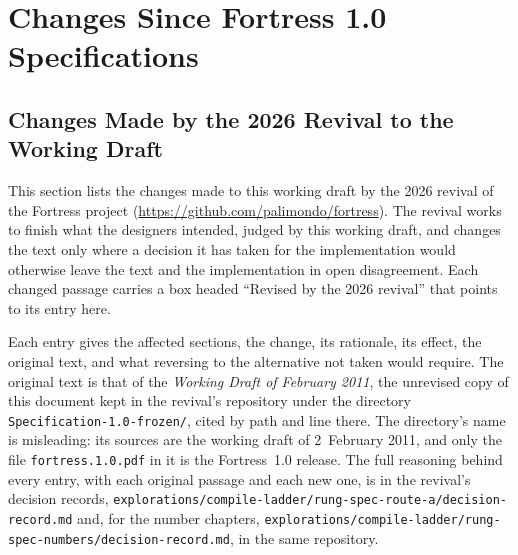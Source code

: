%
%
%
%

\chapter{Changes Since Fortress 1.0 Specifications}


\section{Changes Made by the 2026 Revival to the Working Draft}
\sloppy

This section lists the changes made to this working draft by the 2026
revival of the Fortress project (\url{https://github.com/palimondo/fortress}).
The revival works to finish what the designers intended, judged by this
working draft, and changes the text only where a decision it has taken for
the implementation would otherwise leave the text and the implementation in
open disagreement.
Each changed passage carries a box headed
``Revised by the 2026 revival'' that points to its entry here.

Each entry gives the affected sections, the change, its rationale, its
effect, the original text, and what reversing to the alternative not taken
would require.
The original text is that of the \emph{Working Draft of February 2011},
the unrevised copy of this document kept in the revival's repository under
the directory \nolinkurl{Specification-1.0-frozen/}, cited by path and line
there.
The directory's name is misleading: its sources are the working draft of
2~February 2011, and only the file \nolinkurl{fortress.1.0.pdf} in it is the
Fortress~1.0 release.
The full reasoning behind every entry, with each original passage and each
new one, is in the revival's decision records,
\nolinkurl{explorations/compile-ladder/rung-spec-route-a/decision-record.md}
and, for the number chapters,
\nolinkurl{explorations/compile-ladder/rung-spec-numbers/decision-record.md},
in the same repository.

